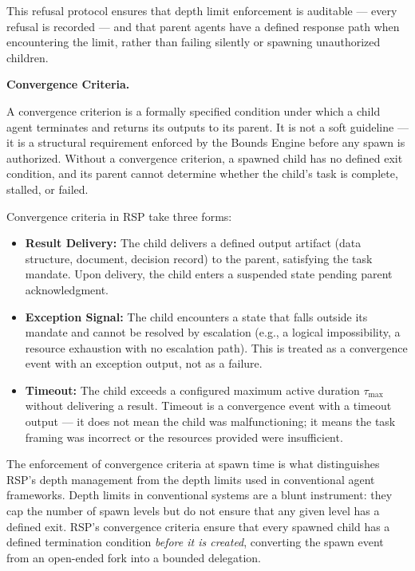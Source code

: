 This refusal protocol ensures that depth limit enforcement is auditable — every refusal is recorded — and that parent agents have a defined response path when encountering the limit, rather than failing silently or spawning unauthorized children.

\bigskip
\noindent\textbf{Convergence Criteria.}

A convergence criterion is a formally specified condition under which a child agent terminates and returns its outputs to its parent. It is not a soft guideline — it is a structural requirement enforced by the Bounds Engine before any spawn is authorized. Without a convergence criterion, a spawned child has no defined exit condition, and its parent cannot determine whether the child's task is complete, stalled, or failed.

Convergence criteria in RSP take three forms:

\begin{itemize}
    \item \textbf{Result Delivery:} The child delivers a defined output artifact (data structure, document, decision record) to the parent, satisfying the task mandate. Upon delivery, the child enters a suspended state pending parent acknowledgment.
    \item \textbf{Exception Signal:} The child encounters a state that falls outside its mandate and cannot be resolved by escalation (e.g., a logical impossibility, a resource exhaustion with no escalation path). This is treated as a convergence event with an exception output, not as a failure.
    \item \textbf{Timeout:} The child exceeds a configured maximum active duration $\tau_{\text{max}}$ without delivering a result. Timeout is a convergence event with a timeout output — it does not mean the child was malfunctioning; it means the task framing was incorrect or the resources provided were insufficient.
\end{itemize}

The enforcement of convergence criteria at spawn time is what distinguishes RSP's depth management from the depth limits used in conventional agent frameworks. Depth limits in conventional systems are a blunt instrument: they cap the number of spawn levels but do not ensure that any given level has a defined exit. RSP's convergence criteria ensure that every spawned child has a defined termination condition \textit{before it is created}, converting the spawn event from an open-ended fork into a bounded delegation.

